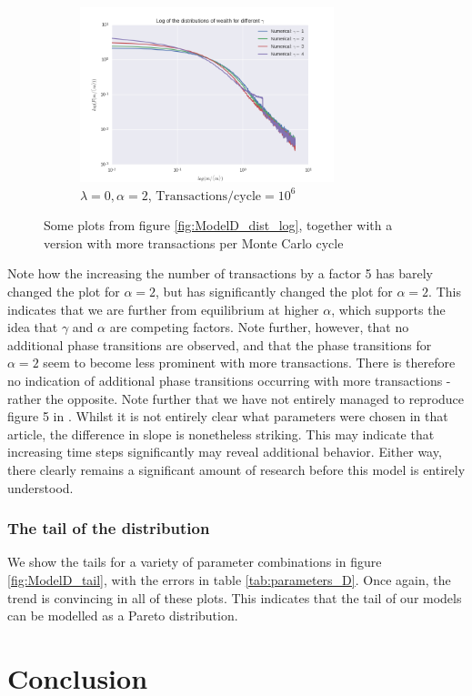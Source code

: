 \documentclass[a4paper, 10pt]{article}
\begin{document}
\begin{figure}[!hb]
\begin{subfigure}[H!]{0.5\textwidth}
        \centering
        \includegraphics[height=2.0in]{logDistGammasA2_v2.png}
        \caption{$\lambda=0, \alpha=2$, $\mathrm{Transactions/cycle}=10^6$}
    \end{subfigure}
\caption{Some plots from figure \ref{fig:ModelD_dist_log}, together with a version with more transactions per Monte Carlo cycle}
\end{figure}
\linebreak
Note how the increasing the number of transactions by a factor 5 has barely changed the plot for $\alpha=2$, but has significantly changed the plot for $\alpha=2$. This indicates that we are further from equilibrium at higher $\alpha$, which supports the idea that $\gamma$ and $\alpha$ are competing factors. Note further, however, that no additional phase transitions are observed, and that the phase transitions for $\alpha=2$ seem to become less prominent with more transactions. There is therefore no indication of additional phase transitions occurring with more transactions - rather the opposite. Note further that we have not entirely managed to reproduce figure 5 in \cite{AgentBased}. Whilst it is not entirely clear what parameters were chosen in that article, the difference in slope is nonetheless striking. This may indicate that increasing time steps significantly may reveal additional behavior. Either way, there clearly remains a significant amount of research before this model is entirely understood.
\subsubsection{The tail of the distribution}
We show the tails for a variety of parameter combinations in figure \ref{fig:ModelD_tail}, with the errors in table \ref{tab:parameters_D}. Once again, the trend is convincing in all of these plots. This indicates that the tail of our models can be modelled as a Pareto distribution.  
\section{Conclusion}
\end{document}
